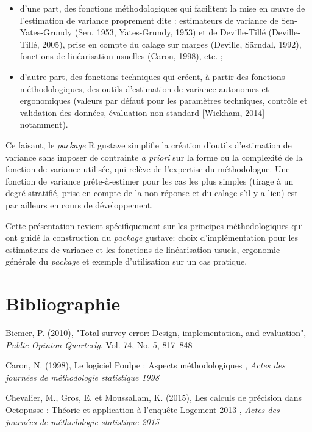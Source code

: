 \documentclass[12pt]{article}
\begin{document}
\begin{itemize}
\item d'une part, des fonctions méthodologiques qui facilitent la mise en \oe uvre de l'estimation de variance proprement dite : estimateurs de variance de Sen-Yates-Grundy (Sen, 1953, Yates-Grundy, 1953) et de Deville-Tillé (Deville-Tillé, 2005), prise en compte du calage sur marges (Deville, Särndal, 1992), fonctions de linéarisation usuelles (Caron, 1998), etc. ;
\item d'autre part, des fonctions techniques qui créent, à partir des fonctions méthodologiques, des outils d'estimation de variance autonomes et ergonomiques (valeurs par défaut pour les paramètres techniques, contrôle et validation des données, évaluation non-standard [Wickham, 2014] notamment).
\end{itemize}

Ce faisant, le \textit{package} R gustave simplifie la création d'outils d'estimation de variance sans imposer de contrainte \textit{a priori} sur la forme ou la complexité de la fonction de variance utilisée, qui relève de l'expertise du méthodologue. Une fonction de variance \og prête-à-estimer \fg{} pour les cas les plus simples (tirage à un degré stratifié, prise en compte de la non-réponse et du calage s'il y a lieu) est par ailleurs en cours de développement.

\bigskip Cette présentation revient spécifiquement sur les principes méthodologiques qui ont guidé la construction du \textit{package} gustave: choix d'implémentation pour les estimateurs de variance et les fonctions de linéarisation usuels, ergonomie générale du \textit{package} et exemple d'utilisation sur un cas pratique.

\section*{Bibliographie}

\noindent Biemer, P. (2010), "Total survey error: Design, implementation, and evaluation", \textit{Public Opinion Quarterly}, Vol. 74, No. 5, 817–848

\noindent Caron, N. (1998), \og Le logiciel Poulpe : Aspects méthodologiques \fg{}, \textit{Actes des journées de méthodologie statistique 1998}

\noindent Chevalier, M., Gros, E. et Moussallam, K. (2015), \og Les calculs de précision dans Octopusse : Théorie et application à l'enquête Logement 2013 \fg{}, \textit{Actes des journées de méthodologie statistique 2015}
\end{document}
